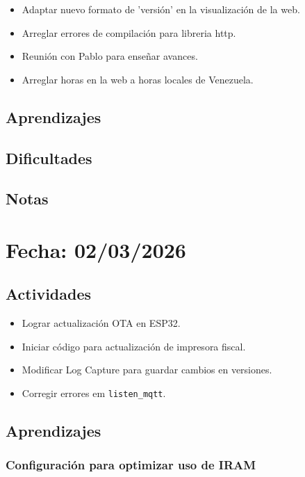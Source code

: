 \documentclass[12pt, a4paper]{article}
\begin{document}
    \begin{itemize}
        \item Adaptar nuevo formato de 'versión' en la visualización de la web.
        \item Arreglar errores de compilación para libreria http.
        \item Reunión con Pablo para enseñar avances.
        \item Arreglar horas en la web a horas locales de Venezuela.
    \end{itemize}

    \subsection*{Aprendizajes}

    \subsection*{Dificultades}

    \subsection*{Notas}

    \section*{Fecha: 02/03/2026}

    \subsection*{Actividades}

    \begin{itemize}
        \item Lograr actualización OTA en ESP32.
        \item Iniciar código para actualización de impresora fiscal.
        \item Modificar Log Capture para guardar cambios en versiones.
        \item Corregir errores em \texttt{listen\_mqtt}.
    \end{itemize}

    \subsection*{Aprendizajes}

    {\color{red} \subsubsection*{Configuración para optimizar uso de IRAM}}
\end{document}
